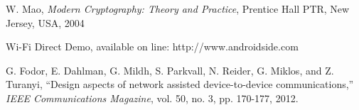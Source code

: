 \documentclass[conference]{IEEEtran}
\begin{document}
\begin{thebibliography}{99}
W. Mao, \emph{Modern Cryptography: Theory and Practice}, Prentice Hall PTR, New Jersey, USA, 2004

Wi-Fi Direct Demo, available on line: http://www.androidside.com

G. Fodor, E. Dahlman, G. Mildh, S. Parkvall, N. Reider, G. Miklos, and Z. Turanyi, ``Design aspects of network assisted device-to-device communications,'' \emph{IEEE Communications Magazine}, vol. 50, no. 3, pp. 170-177, 2012.





\end{thebibliography}
\end{document}

